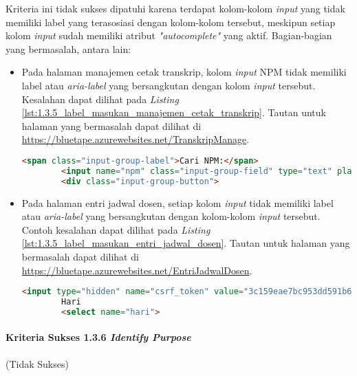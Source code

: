 Kriteria ini tidak sukses dipatuhi karena terdapat kolom-kolom \textit{input} yang tidak memiliki label yang terasosiasi dengan kolom-kolom tersebut, meskipun setiap kolom \textit{input} sudah memiliki atribut \textit{"autocomplete"} yang aktif. Bagian-bagian yang bermasalah, antara lain:
\begin{itemize}
    \item Pada halaman manajemen cetak transkrip, kolom \textit{input} NPM tidak memiliki label atau \textit{aria-label} yang bersangkutan dengan kolom \textit{input} tersebut. Kesalahan dapat dilihat pada \textit{Listing} \ref{lst:1.3.5_label_masukan_manajemen_cetak_transkrip}. Tautan untuk halaman yang bermasalah dapat dilihat di \url{https://bluetape.azurewebsites.net/TranskripManage}.
    \begin{lstlisting}[frame=single, label={lst:1.3.5_label_masukan_manajemen_cetak_transkrip}, language=HTML, caption=Pelanggaran Kriteria Sukses 1.3.5 pada Halaman Manajemen Cetak Transkrip]
        <span class="input-group-label">Cari NPM:</span>
        <input name="npm" class="input-group-field" type="text" placeholder="2013730013" maxlength="10" minlength="10"/>
        <div class="input-group-button">
    \end{lstlisting}
    
    \item Pada halaman entri jadwal dosen, setiap kolom \textit{input} tidak memiliki label atau \textit{aria-label} yang bersangkutan dengan kolom-kolom \textit{input} tersebut. Contoh kesalahan dapat dilihat pada \textit{Listing} \ref{lst:1.3.5_label_masukan_entri_jadwal_dosen}. Tautan untuk halaman yang bermasalah dapat dilihat di \url{https://bluetape.azurewebsites.net/EntriJadwalDosen}.
    \begin{lstlisting}[frame=single, label={lst:1.3.5_label_masukan_entri_jadwal_dosen}, language=HTML, caption=Pelanggaran Kriteria Sukses 1.3.5 pada Halaman Entri Jadwal Dosen]
        <input type="hidden" name="csrf_token" value="3c159eae7bc953dd591b679c080ed066" />
        Hari
        <select name="hari">
    \end{lstlisting}
\end{itemize}

\paragraph{Kriteria Sukses 1.3.6 \textit{Identify Purpose}}
\label{par:kepatuhan_bluetape_kriteria_sukses_1.3.6}
(Tidak Sukses)\\

